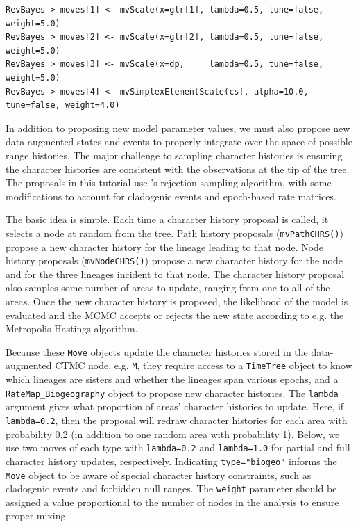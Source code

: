 \documentclass[11pt]{article}
\begin{document}
\begin{snugshade}
\begin{lstlisting}
RevBayes > moves[1] <- mvScale(x=glr[1], lambda=0.5, tune=false, weight=5.0)
RevBayes > moves[2] <- mvScale(x=glr[2], lambda=0.5, tune=false, weight=5.0)
RevBayes > moves[3] <- mvScale(x=dp, 	 lambda=0.5, tune=false, weight=5.0)
RevBayes > moves[4] <- mvSimplexElementScale(csf, alpha=10.0, tune=false, weight=4.0)
\end{lstlisting}
\end{snugshade}

In addition to proposing new model parameter values, we must also propose new data-augmented states and events to properly integrate over the space of possible range histories.
The major challenge to sampling character histories is ensuring the character histories are consistent with the observations at the tip of the tree.
The proposals in this tutorial use \citet{nielsen02}'s rejection sampling algorithm, with some modifications to account for cladogenic events and epoch-based rate matrices.

The basic idea is simple.
Each time a character history proposal is called, it selects a node at random from the tree.
Path history proposals ({\tt mvPathCHRS()}) propose a new character history for the lineage leading to that node.
Node history proposals ({\tt mvNodeCHRS()}) propose a new character history for the node and for the three lineages incident to that node.
The character history proposal also samples some number of areas to update, ranging from one to all of the areas.
Once the new character history is proposed, the likelihood of the model is evaluated and the MCMC accepts or rejects the new state according to e.g. the Metropolis-Hastings algorithm.

Because these {\tt Move} objects update the character histories stored in the data-augmented CTMC node, e.g. {\tt M},
they require access to a {\tt TimeTree} object to know which lineages are sisters and whether the lineages span various epochs, and a {\tt RateMap\_Biogeography} object to propose new character histories.
The {\tt lambda} argument gives what proportion of areas' character histories to update.
Here, if {\tt lambda=0.2}, then the proposal will redraw character histories for each area with probability 0.2 (in addition to one random area with probability 1).
Below, we use two moves of each type with {\tt lambda=0.2} and {\tt lambda=1.0} for partial and full character history updates, respectively.
Indicating {\tt type="biogeo"} informs the {\tt Move} object to be aware of special character history constraints, such as cladogenic events and forbidden null ranges.
The {\tt weight} parameter should be assigned a value proportional to the number of nodes in the analysis to ensure proper mixing.
\end{document}
